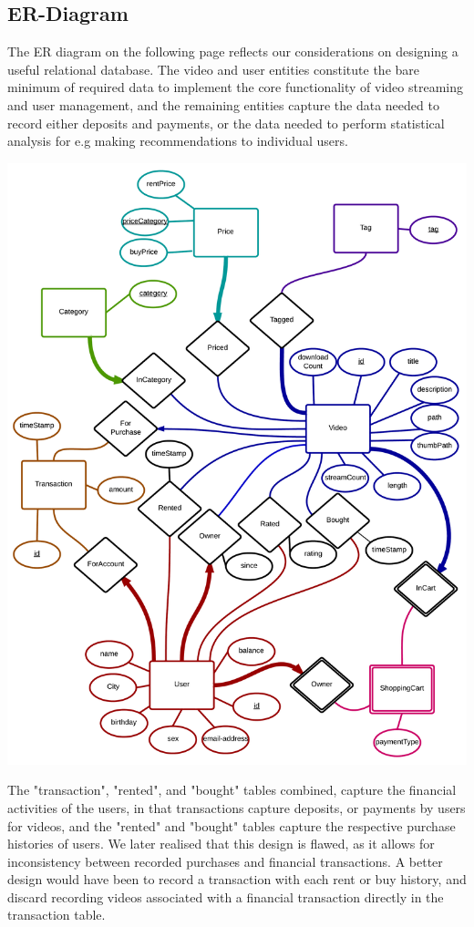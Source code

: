 \subsection{ER-Diagram}
The ER diagram on the following page reflects our considerations on designing a useful relational database. The video and user entities constitute the bare minimum of required data to implement the core functionality of video streaming and user management, and the remaining entities capture the data needed to record either deposits and payments, or the data needed to perform statistical analysis for e.g making recommendations to individual users.
\begin{center}
\includegraphics[scale=0.15]{ERDiagram.png}
\end{center}

The "transaction", "rented", and "bought" tables combined, capture the financial activities of the users, in that transactions capture deposits, or payments by users for videos, and the "rented" and "bought" tables capture the respective purchase histories of users.
We later realised that this design is flawed, as it allows for inconsistency between recorded purchases and financial transactions. A better design would have been to record a transaction with each rent or buy history, and discard recording videos associated with a financial transaction directly in the transaction table.

